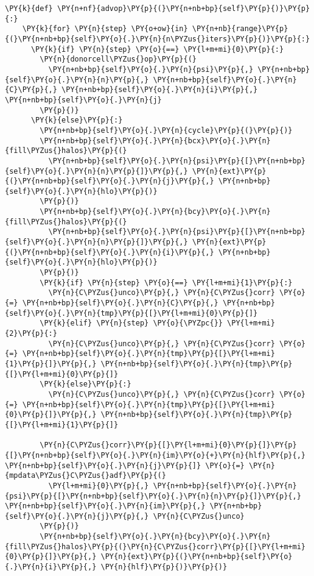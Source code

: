 \begin{Verbatim}[commandchars=\\\{\}]
  \PY{k}{def} \PY{n+nf}{advop}\PY{p}{(}\PY{n+nb+bp}{self}\PY{p}{)}\PY{p}{:}
    \PY{k}{for} \PY{n}{step} \PY{o+ow}{in} \PY{n+nb}{range}\PY{p}{(}\PY{n+nb+bp}{self}\PY{o}{.}\PY{n}{n\PYZus{}iters}\PY{p}{)}\PY{p}{:}
      \PY{k}{if} \PY{n}{step} \PY{o}{==} \PY{l+m+mi}{0}\PY{p}{:}
        \PY{n}{donorcell\PYZus{}op}\PY{p}{(}
          \PY{n+nb+bp}{self}\PY{o}{.}\PY{n}{psi}\PY{p}{,} \PY{n+nb+bp}{self}\PY{o}{.}\PY{n}{n}\PY{p}{,} \PY{n+nb+bp}{self}\PY{o}{.}\PY{n}{C}\PY{p}{,} \PY{n+nb+bp}{self}\PY{o}{.}\PY{n}{i}\PY{p}{,} \PY{n+nb+bp}{self}\PY{o}{.}\PY{n}{j}
        \PY{p}{)}
      \PY{k}{else}\PY{p}{:}
        \PY{n+nb+bp}{self}\PY{o}{.}\PY{n}{cycle}\PY{p}{(}\PY{p}{)}
        \PY{n+nb+bp}{self}\PY{o}{.}\PY{n}{bcx}\PY{o}{.}\PY{n}{fill\PYZus{}halos}\PY{p}{(}
          \PY{n+nb+bp}{self}\PY{o}{.}\PY{n}{psi}\PY{p}{[}\PY{n+nb+bp}{self}\PY{o}{.}\PY{n}{n}\PY{p}{]}\PY{p}{,} \PY{n}{ext}\PY{p}{(}\PY{n+nb+bp}{self}\PY{o}{.}\PY{n}{j}\PY{p}{,} \PY{n+nb+bp}{self}\PY{o}{.}\PY{n}{hlo}\PY{p}{)}
        \PY{p}{)}
        \PY{n+nb+bp}{self}\PY{o}{.}\PY{n}{bcy}\PY{o}{.}\PY{n}{fill\PYZus{}halos}\PY{p}{(}
          \PY{n+nb+bp}{self}\PY{o}{.}\PY{n}{psi}\PY{p}{[}\PY{n+nb+bp}{self}\PY{o}{.}\PY{n}{n}\PY{p}{]}\PY{p}{,} \PY{n}{ext}\PY{p}{(}\PY{n+nb+bp}{self}\PY{o}{.}\PY{n}{i}\PY{p}{,} \PY{n+nb+bp}{self}\PY{o}{.}\PY{n}{hlo}\PY{p}{)}
        \PY{p}{)}
        \PY{k}{if} \PY{n}{step} \PY{o}{==} \PY{l+m+mi}{1}\PY{p}{:}
          \PY{n}{C\PYZus{}unco}\PY{p}{,} \PY{n}{C\PYZus{}corr} \PY{o}{=} \PY{n+nb+bp}{self}\PY{o}{.}\PY{n}{C}\PY{p}{,} \PY{n+nb+bp}{self}\PY{o}{.}\PY{n}{tmp}\PY{p}{[}\PY{l+m+mi}{0}\PY{p}{]}
        \PY{k}{elif} \PY{n}{step} \PY{o}{\PYZpc{}} \PY{l+m+mi}{2}\PY{p}{:}
          \PY{n}{C\PYZus{}unco}\PY{p}{,} \PY{n}{C\PYZus{}corr} \PY{o}{=} \PY{n+nb+bp}{self}\PY{o}{.}\PY{n}{tmp}\PY{p}{[}\PY{l+m+mi}{1}\PY{p}{]}\PY{p}{,} \PY{n+nb+bp}{self}\PY{o}{.}\PY{n}{tmp}\PY{p}{[}\PY{l+m+mi}{0}\PY{p}{]}
        \PY{k}{else}\PY{p}{:}
          \PY{n}{C\PYZus{}unco}\PY{p}{,} \PY{n}{C\PYZus{}corr} \PY{o}{=} \PY{n+nb+bp}{self}\PY{o}{.}\PY{n}{tmp}\PY{p}{[}\PY{l+m+mi}{0}\PY{p}{]}\PY{p}{,} \PY{n+nb+bp}{self}\PY{o}{.}\PY{n}{tmp}\PY{p}{[}\PY{l+m+mi}{1}\PY{p}{]}

        \PY{n}{C\PYZus{}corr}\PY{p}{[}\PY{l+m+mi}{0}\PY{p}{]}\PY{p}{[}\PY{n+nb+bp}{self}\PY{o}{.}\PY{n}{im}\PY{o}{+}\PY{n}{hlf}\PY{p}{,} \PY{n+nb+bp}{self}\PY{o}{.}\PY{n}{j}\PY{p}{]} \PY{o}{=} \PY{n}{mpdata\PYZus{}C\PYZus{}adf}\PY{p}{(}
          \PY{l+m+mi}{0}\PY{p}{,} \PY{n+nb+bp}{self}\PY{o}{.}\PY{n}{psi}\PY{p}{[}\PY{n+nb+bp}{self}\PY{o}{.}\PY{n}{n}\PY{p}{]}\PY{p}{,} \PY{n+nb+bp}{self}\PY{o}{.}\PY{n}{im}\PY{p}{,} \PY{n+nb+bp}{self}\PY{o}{.}\PY{n}{j}\PY{p}{,} \PY{n}{C\PYZus{}unco}
        \PY{p}{)}
        \PY{n+nb+bp}{self}\PY{o}{.}\PY{n}{bcy}\PY{o}{.}\PY{n}{fill\PYZus{}halos}\PY{p}{(}\PY{n}{C\PYZus{}corr}\PY{p}{[}\PY{l+m+mi}{0}\PY{p}{]}\PY{p}{,} \PY{n}{ext}\PY{p}{(}\PY{n+nb+bp}{self}\PY{o}{.}\PY{n}{i}\PY{p}{,} \PY{n}{hlf}\PY{p}{)}\PY{p}{)}
        

\end{Verbatim}
